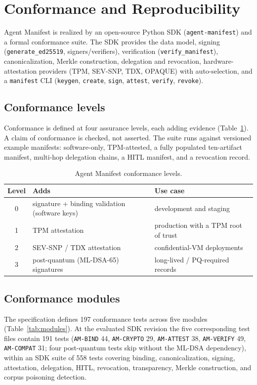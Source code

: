 \section{Conformance and Reproducibility}
\label{sec:conformance}

Agent Manifest is realized by an open-source Python SDK (\texttt{agent-manifest}) and
a formal conformance suite. The SDK provides the data model, signing
(\texttt{generate\_ed25519}, signers/verifiers), verification
(\texttt{verify\_manifest}), canonicalization, Merkle construction, delegation and
revocation, hardware-attestation providers (TPM, SEV-SNP, TDX, OPAQUE) with
auto-selection, and a \texttt{manifest} CLI (\texttt{keygen}, \texttt{create},
\texttt{sign}, \texttt{attest}, \texttt{verify}, \texttt{revoke}).

\subsection{Conformance levels}

Conformance is defined at four assurance levels, each adding evidence
(Table~\ref{tab:levels}). A claim of conformance is checked, not asserted. The suite
runs against versioned example manifests: software-only, TPM-attested, a fully
populated ten-artifact manifest, multi-hop delegation chains, a HITL manifest, and a
revocation record.

\begin{table}[h]
\centering
\small
\caption{Agent Manifest conformance levels.}
\label{tab:levels}
\begin{tabular}{cll}
\toprule
Level & Adds & Use case \\
\midrule
0 & signature + binding validation (software keys) & development and staging \\
1 & TPM attestation & production with a TPM root of trust \\
2 & SEV-SNP / TDX attestation & confidential-VM deployments \\
3 & post-quantum (ML-DSA-65) signatures & long-lived / PQ-required records \\
\bottomrule
\end{tabular}
\end{table}

\subsection{Conformance modules}

The specification defines 197 conformance tests across five modules
(Table~\ref{tab:modules}). At the evaluated SDK revision the five corresponding test
files contain 191 tests (\texttt{AM-BIND} 44, \texttt{AM-CRYPTO} 29,
\texttt{AM-ATTEST} 38, \texttt{AM-VERIFY} 49, \texttt{AM-COMPAT} 31; four
post-quantum tests skip without the ML-DSA dependency), within an SDK suite of 558
tests covering binding, canonicalization, signing, attestation, delegation, HITL,
revocation, transparency, Merkle construction, and corpus poisoning detection.

